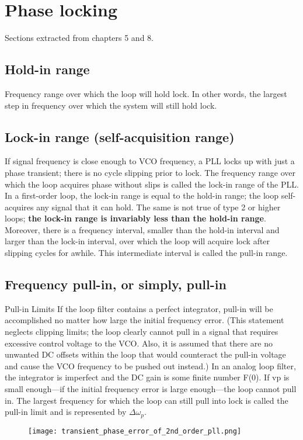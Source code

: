 \documentclass[a4paper]{article}
\begin{document}
\section{Phase locking}
Sections extracted from \cite{Gardner} chapters 5 and 8. 

\subsection{Hold-in range}
Frequency range over which the loop will hold lock. In other words, the largest step in frequency over which the system will still hold lock.	

\subsection{Lock-in range (self-acquisition range)}

If signal frequency is close enough to VCO frequency, a PLL locks up with
just a phase transient; there is no cycle slipping prior to lock. The frequency range over which the loop acquires phase without slips is called the lock-in range of the PLL. In a first-order loop, the lock-in range is equal to the hold-in range; the loop self-acquires any signal that it can hold. The same is not true of type 2 or higher loops; \textbf{the lock-in range is invariably less than the hold-in range}. Moreover, there is a frequency interval, smaller than the hold-in interval
and larger than the lock-in interval, over which the loop will acquire lock after slipping cycles for awhile. This intermediate interval is called the pull-in range.

\subsection{Frequency pull-in, or simply, pull-in}

Pull-in Limits If the loop filter contains a perfect integrator, pull-in will be accomplished no matter how large the initial frequency error. (This statement neglects clipping limits; the loop clearly cannot pull in a signal that requires excessive control voltage to the VCO. Also, it is assumed that there are no unwanted DC offsets within the loop that would counteract the pull-in voltage and cause the VCO frequency to be pushed out instead.) In an analog loop filter, the integrator is imperfect and the DC gain is some finite number F(0). If vp is small enough—if the initial frequency error is large enough—the loop cannot pull in. The largest frequency for which the loop can still pull into lock is called the pull-in limit and is represented by $\Delta\omega_p$.

\begin{figure}[h!]
	\centering
	\texttt{[image: transient\_phase\_error\_of\_2nd\_order\_pll.png]}
	\label{fig:transient_2nd_pll}
	\caption{\cite{Gardner}}
\end{figure}




\end{document}
